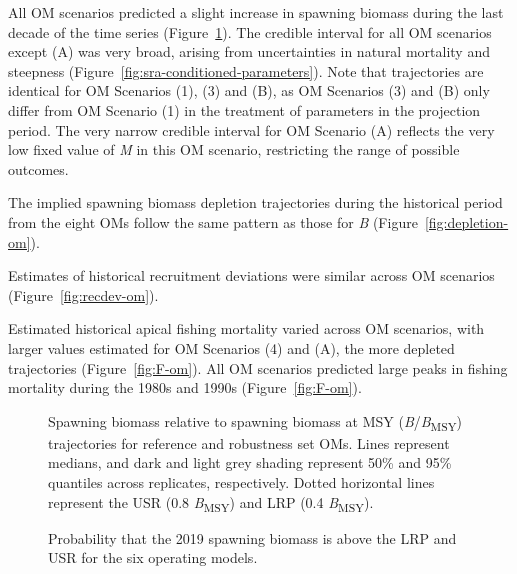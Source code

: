 \documentclass[11pt]{book}
\begin{document}
All OM scenarios predicted a slight increase in spawning biomass during the last decade of the time series (Figure~\ref{fig:biomass-om}). The credible interval for all OM scenarios except (A) was very broad, arising from uncertainties in natural mortality and steepness (Figure~\ref{fig:sra-conditioned-parameters}). Note that trajectories are identical for OM Scenarios (1), (3) and (B), as OM Scenarios (3) and (B) only differ from OM Scenario (1) in the treatment of parameters in the projection period. The very narrow credible interval for OM Scenario (A) reflects the very low fixed value of \emph{M} in this OM scenario, restricting the range of possible outcomes.

The implied spawning biomass depletion trajectories during the historical period from the eight OMs follow the same pattern as those for \emph{B} (Figure~\ref{fig:depletion-om}).

Estimates of historical recruitment deviations were similar across OM scenarios (Figure~\ref{fig:recdev-om}).

Estimated historical apical fishing mortality varied across OM scenarios, with larger values estimated for OM Scenarios (4) and (A), the more depleted trajectories (Figure~\ref{fig:F-om}). All OM scenarios predicted large peaks in fishing mortality during the 1980s and 1990s (Figure~\ref{fig:F-om}).


\begin{figure}[htb]

{\centering {} 

}

\caption{Spawning biomass relative to spawning biomass at MSY (\emph{B}/\emph{B}\textsubscript{MSY}) trajectories for reference and robustness set OMs. Lines represent medians, and dark and light grey shading represent 50\% and 95\% quantiles across replicates, respectively. Dotted horizontal lines represent the USR (0.8 \emph{B}\textsubscript{MSY}) and LRP (0.4 \emph{B}\textsubscript{MSY}).}\label{fig:biomass-om}
\end{figure}

\begin{figure}[htb]

{\centering {} 

}

\caption{Probability that the 2019 spawning biomass is above the LRP and USR for the six operating models.}\label{fig:ref-pt}
\end{figure}
\end{document}
